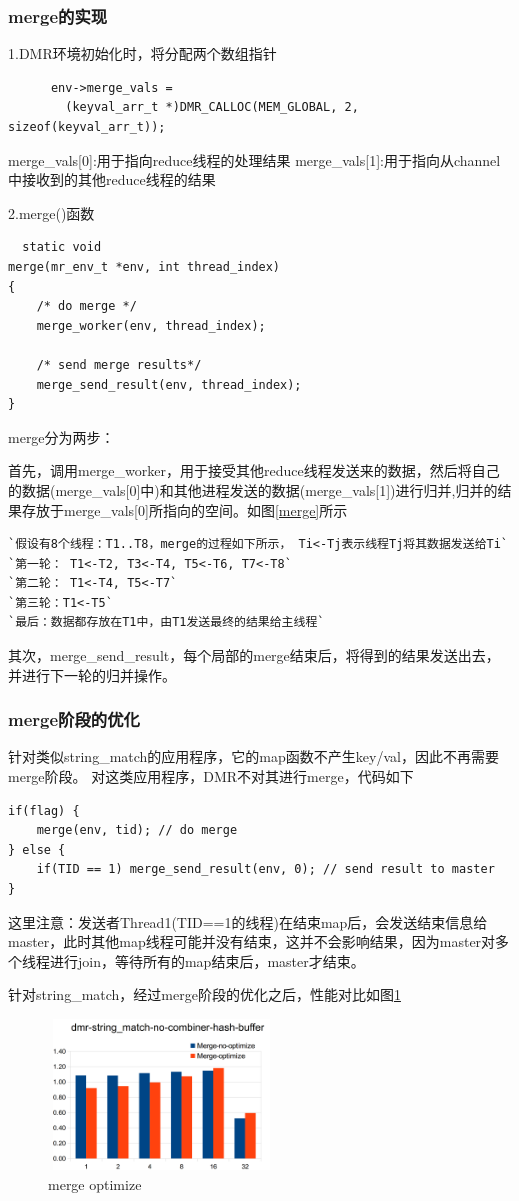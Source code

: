 \subsubsection{merge的实现}
1.DMR环境初始化时，将分配两个数组指针
\begin{lstlisting}
      env->merge_vals =
        (keyval_arr_t *)DMR_CALLOC(MEM_GLOBAL, 2, sizeof(keyval_arr_t));
\end{lstlisting}
merge\_vals[0]:用于指向reduce线程的处理结果
merge\_vals[1]:用于指向从channel中接收到的其他reduce线程的结果

2.merge()函数
\begin{lstlisting}
  static void
merge(mr_env_t *env, int thread_index)
{
    /* do merge */
    merge_worker(env, thread_index);

    /* send merge results*/
    merge_send_result(env, thread_index);
}
\end{lstlisting}
merge分为两步：

首先，调用merge\_worker，用于接受其他reduce线程发送来的数据，然后将自己的数据(merge\_vals[0]中)和其他进程发送的数据(merge\_vals[1])进行归并,归并的结果存放于merge\_vals[0]所指向的空间。如图\ref{merge}所示
\begin{lstlisting}
`假设有8个线程：T1..T8，merge的过程如下所示， Ti<-Tj表示线程Tj将其数据发送给Ti`
`第一轮： T1<-T2, T3<-T4, T5<-T6, T7<-T8`
`第二轮： T1<-T4, T5<-T7`
`第三轮：T1<-T5`
`最后：数据都存放在T1中，由T1发送最终的结果给主线程`
\end{lstlisting}

其次，merge\_send\_result，每个局部的merge结束后，将得到的结果发送出去，并进行下一轮的归并操作。

\subsubsection{merge阶段的优化}
针对类似string\_match的应用程序，它的map函数不产生key/val，因此不再需要merge阶段。
对这类应用程序，DMR不对其进行merge，代码如下
\begin{lstlisting}
if(flag) {
    merge(env, tid); // do merge
} else {
    if(TID == 1) merge_send_result(env, 0); // send result to master
}
\end{lstlisting}
这里注意：发送者Thread1(TID==1的线程)在结束map后，会发送结束信息给master，此时其他map线程可能并没有结束，这并不会影响结果，因为master对多个线程进行join，等待所有的map结束后，master才结束。

针对string\_match，经过merge阶段的优化之后，性能对比如图\ref{merge_opt}
\begin{figure}[!h]
    \centering
    \includegraphics[height=4cm,width=6cm]{img/merge_opt.png}
    \caption{merge optimize}
\label{merge_opt}
\end{figure}
